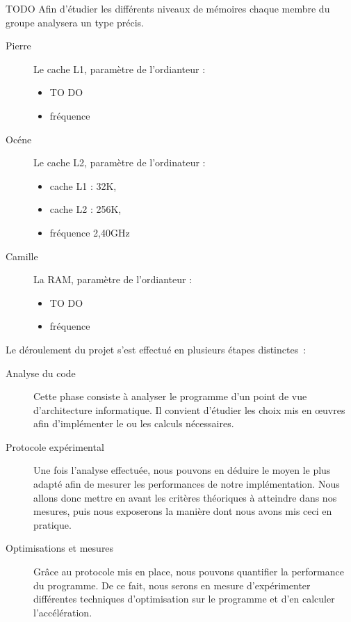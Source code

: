 \documentclass[12pt,a4paper]{article}
\begin{document}
TODO
Afin d'étudier les différents niveaux de mémoires chaque membre du groupe 
analysera un type précis.

\begin{description}
    \item[Pierre] Le cache L1, paramètre de l'ordianteur : 
		\begin{itemize}
				\item TO DO
				\item fréquence
		\end{itemize}
    \item[Océne ] Le cache L2, paramètre de l'ordinateur : 
		\begin{itemize}
			\item cache L1 : 32K,
			\item cache L2 : 256K,
			\item fréquence 2,40GHz
		\end{itemize}
    \item[Camille] La RAM, paramètre de l'ordianteur : 
        \begin{itemize}
			\item TO DO
			\item fréquence
		\end{itemize}
\end{description} 

Le déroulement du projet s'est effectué en plusieurs étapes distinctes :
\begin{description}
    \item[Analyse du code] Cette phase consiste à analyser le programme d'un
        point de vue d'architecture informatique. Il convient d'étudier les
        choix mis en œuvres afin d'implémenter le ou les calculs nécessaires.
    \item[Protocole expérimental] Une fois l'analyse effectuée, nous
        pouvons en déduire le moyen le plus adapté afin de mesurer les
        performances de notre implémentation. Nous allons donc mettre en
        avant les critères théoriques à atteindre dans nos mesures, puis
        nous exposerons la manière dont nous avons mis ceci en pratique.
    \item[Optimisations et mesures] Grâce au protocole mis en place, nous
        pouvons quantifier la performance du programme. De ce fait, nous serons
        en mesure d'expérimenter différentes techniques d'optimisation sur le
        programme et d'en calculer l'accélération.
\end{description}
\end{document}
